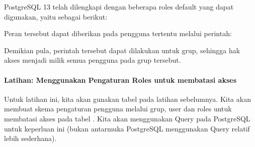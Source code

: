 \documentclass[letterpaper,10pt,english]{sphinxmanual}
\begin{document}
PostgreSQL 13 telah dilengkapi dengan beberapa roles default yang dapat digunakan, yaitu sebagai berikut:


Peran  tersebut dapat diberikan pada pengguna tertentu melalui perintah:

\begin{sphinxVerbatim}[commandchars=\\\{\}]
   
\end{sphinxVerbatim}

Demikian pula, perintah tersebut dapat dilakukan untuk grup, sehingga hak akses menjadi milik semua pengguna pada grup tersebut.


\paragraph{Latihan: Menggunakan Pengaturan Roles untuk membatasi akses}
\label{\detokenize{sesi2/dbmanagement:latihan-menggunakan-pengaturan-roles-untuk-membatasi-akses}}
Untuk latihan ini, kita akan gunakan tabel  pada latihan sebelumnya. Kita akan membuat skema pengaturan pengguna melalui grup, user dan roles untuk membatasi akses pada tabel . Kita akan menggunakan Query pada PostgreSQL untuk keperluan ini (bukan antarmuka PostgreSQL \sphinxhyphen{} menggunakan Query relatif lebih sederhana).
\end{document}
